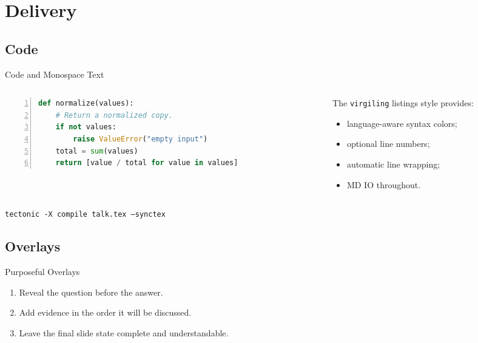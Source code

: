 \documentclass[10pt,aspectratio=169]{virgiling-slides}
\begin{document}
\section{Delivery}

\subsection{Code}

\begin{frame}[fragile]{Code and Monospace Text}
  \begin{columns}[T,onlytextwidth]
    \begin{column}{0.59\textwidth}
\begin{lstlisting}[language=Python,numbers=left]
def normalize(values):
    # Return a normalized copy.
    if not values:
        raise ValueError("empty input")
    total = sum(values)
    return [value / total for value in values]
\end{lstlisting}
    \end{column}
    \begin{column}{0.36\textwidth}
      The \texttt{virgiling} listings style provides:
      \begin{itemize}
        \item language-aware syntax colors;
        \item optional line numbers;
        \item automatic line wrapping;
        \item MD IO throughout.
      \end{itemize}
    \end{column}
  \end{columns}

  \medskip
  \texttt{tectonic -X compile talk.tex --synctex}
\end{frame}

\subsection{Overlays}

\begin{frame}{Purposeful Overlays}
  \begin{enumerate}[<+->]
    \item Reveal the question before the answer.
    \item Add evidence in the order it will be discussed.
    \item Leave the final slide state complete and understandable.
  \end{enumerate}

\end{frame}
\end{document}
